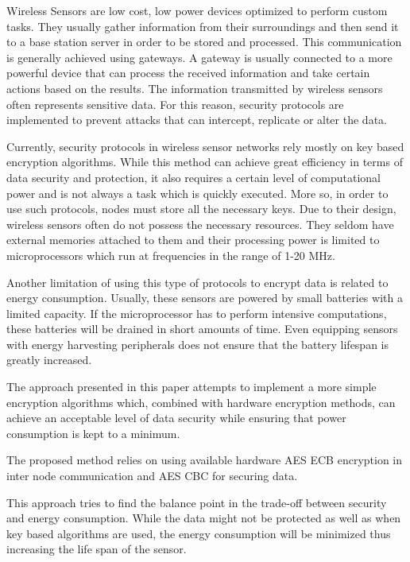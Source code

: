 Wireless Sensors are low cost, low power devices optimized to perform custom tasks. They usually
gather information from their surroundings and then send it to a base station server in order
to be stored and processed. This communication is generally achieved using gateways. A
gateway is usually connected to a more powerful device that can process the received information and take certain actions based on the results. 
The information transmitted by wireless sensors often represents sensitive data. For this reason, security protocols are implemented to 
prevent attacks that can intercept, replicate or alter the data.

Currently, security protocols in wireless sensor networks rely mostly on key based encryption algorithms. While this method can achieve 
great efficiency in terms of data security and protection, it also requires a certain level of computational power and is not 
always a task which is quickly executed. More so, in order to use such protocols, nodes must store all the necessary keys.
Due to their design, wireless sensors often do not possess the necessary resources. They seldom have external memories attached 
to them and their processing power is limited to microprocessors which run at frequencies in the range of 1-20 MHz.

Another limitation of using this type of protocols to encrypt data is related to energy consumption. Usually, these sensors are 
powered by small batteries with a limited capacity. If the microprocessor has to perform intensive computations, these batteries 
will be drained in short amounts of time. Even equipping sensors with energy harvesting peripherals does not ensure that 
the battery lifespan is greatly increased.

The approach presented in this paper attempts to implement a more simple encryption algorithms which, combined with hardware 
encryption methods, can achieve an acceptable level of data security while ensuring that power consumption is kept to a minimum.

The proposed method relies on using available hardware AES ECB encryption in inter node
communication and AES CBC for securing data.

This approach tries to find the balance point in the trade-off between security and energy consumption. While the data might not be 
protected as well as when key based algorithms are used, the energy consumption will be minimized thus increasing the life span of the sensor.
